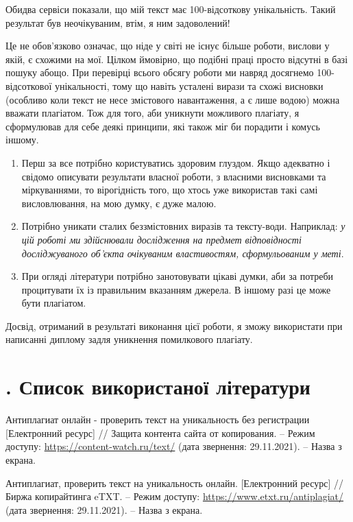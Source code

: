 \documentclass[oneside,14pt,a4paper]{extreport}
\newcommand\Section[1]{
 \refstepcounter{section}
 \section*{
  \arabic{section}. #1}
}
\begin{document}
Обидва сервіси показали, що мій текст має 100-відсоткову унікальність. Такий результат був неочікуваним, втім, я ним задоволений!

Це не обов'язково означає, що ніде у світі не існує більше роботи, вислови у якій, є схожими на мої. Цілком ймовірно, що подібні праці просто відсутні в базі пошуку абощо. При перевірці всього обсягу роботи ми навряд досягнемо 100-відсоткової унікальності, тому що навіть усталені вирази та схожі висновки (особливо коли текст не несе змістового навантаження, а є лише \flqq{}водою\frqq{}) можна вважати плагіатом. Тож для того, аби уникнути можливого плагіату, я сформулював для себе деякі принципи, які також міг би порадити і комусь іншому.

\begin{enumerate}
    \item Перш за все потрібно користуватись здоровим глуздом. Якщо адекватно і свідомо описувати результати власної роботи, з власними висновками та міркуваннями, то вірогідність того, що хтось уже використав такі самі висловлювання, на мою думку, є дуже малою.
    \item Потрібно уникати сталих беззмістовних виразів та тексту-\flqq{}води\frqq{}. Наприклад: \textit{у цій роботі ми здійснювали дослідження на предмет відповідності досліджуваного об'єкта очікуваним властивостям, сформульованим у меті}.
    \item При огляді літератури потрібно занотовувати цікаві думки, аби за потреби процитувати їх із правильним вказанням джерела. В іншому разі це може бути плагіатом.
\end{enumerate}

Досвід, отриманий в результаті виконання цієї роботи, я зможу використати при написанні диплому задля уникнення помилкового плагіату.

\Section{Список використаної літератури}

\begingroup
\renewcommand{\section}[2]{}
\renewcommand{\chapter}[2]{}
\begin{thebibliography}{99}

 Антиплагиат онлайн - проверить текст на уникальность без регистрации [Електронний ресурс] // Защита контента сайта от копирования. – Режим доступу: \url{https://content-watch.ru/text/} (дата звернення: 29.11.2021). – Назва з екрана.

 Антиплагиат, проверить текст на уникальность онлайн. [Електронний ресурс] // Биржа копирайтинга eTXT. – Режим доступу: \url{https://www.etxt.ru/antiplagiat/} (дата звернення: 29.11.2021). – Назва з екрана.

\end{thebibliography}
\end{document}
